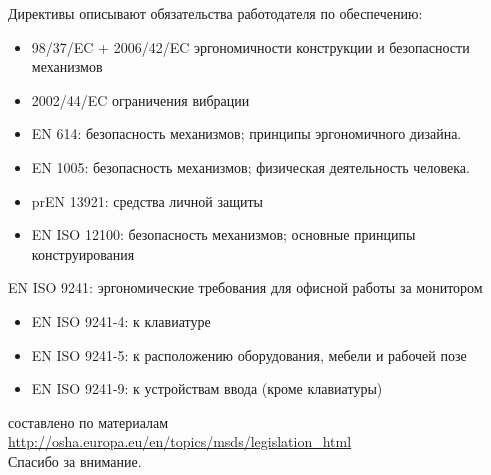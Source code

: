 \documentclass[17pt]{beamer}
\begin{document}
\begin{frame}
Директивы описывают обязательства работодателя по обеспечению:
\begin{itemize}
\item 98/37/EC + 2006/42/EC эргономичности конструкции и безопасности механизмов
\item 2002/44/EC ограничения вибрации
\end{itemize}
\end{frame}

\begin{frame}
\begin{itemize}
\item EN 614: безопасность механизмов; принципы эргономичного дизайна.
\item EN 1005: безопасность механизмов; физическая деятельность человека.
\item prEN 13921: средства личной защиты
\item EN ISO 12100: безопасность механизмов; основные принципы конструирования
\end{itemize}
\end{frame}

\begin{frame}
EN ISO 9241: эргономические требования для офисной работы за монитором
\begin{itemize}
\item EN ISO 9241-4: к клавиатуре
\item EN ISO 9241-5: к расположению оборудования, мебели и рабочей позе
\item EN ISO 9241-9: к устройствам ввода (кроме клавиатуры)
\end{itemize}
\end{frame}

\begin{frame}
\begin{center}
составлено по материалам
\url{http://osha.europa.eu/en/topics/msds/legislation_html} \\
\vspace{10 mm}
Спасибо за внимание.
\end{center}
\end{frame}
\end{document}
